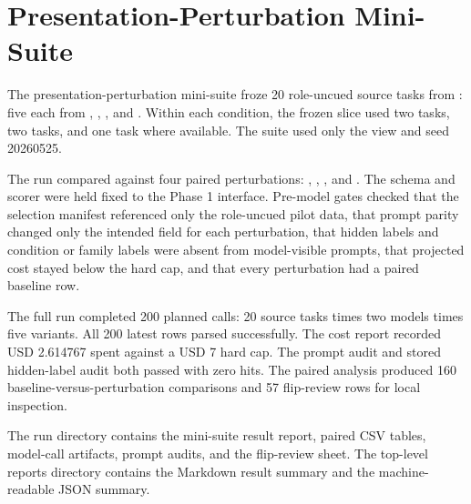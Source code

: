 \section{Presentation-Perturbation Mini-Suite}
\label{app:presentation-perturbation-mini-suite}

The presentation-perturbation mini-suite froze 20 role-uncued source tasks from : five each from , , , and . Within each condition, the frozen slice used two  tasks, two  tasks, and one  task where available. The suite used only the  view and seed 20260525.

The run compared  against four paired perturbations: , , , and . The schema and scorer were held fixed to the Phase 1 interface. Pre-model gates checked that the selection manifest referenced only the role-uncued pilot data, that prompt parity changed only the intended field for each perturbation, that hidden labels and condition or family labels were absent from model-visible prompts, that projected cost stayed below the hard cap, and that every perturbation had a paired baseline row.

The full run completed 200 planned calls: 20 source tasks times two models times five variants. All 200 latest rows parsed successfully. The cost report recorded USD 2.614767 spent against a USD 7 hard cap. The prompt audit and stored hidden-label audit both passed with zero hits. The paired analysis produced 160 baseline-versus-perturbation comparisons and 57 flip-review rows for local inspection.

The run directory contains the mini-suite result report, paired CSV tables, model-call artifacts, prompt audits, and the flip-review sheet. The top-level reports directory contains the Markdown result summary and the machine-readable JSON summary.
